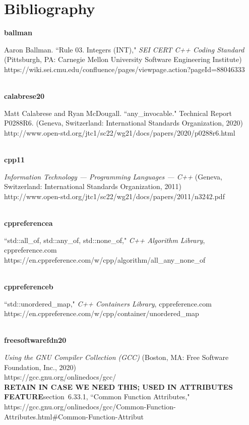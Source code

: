 
\chapter*{Bibliography}

\noindent\textbf{ballman}\\
\hspace*{2em}\parbox[t]{\textwidth}{Aaron Ballman. ``Rule 03. Integers (INT)," \textit{ SEI CERT C++ Coding Standard} (Pittsburgh, PA: Carnegie Mellon University Software Engineering Institute)\\
https://wiki.sei.cmu.edu/confluence/pages/viewpage.action?pageId=88046333}\\

\noindent\textbf{calabrese20}\\
\hspace*{2em}\parbox[t]{\textwidth}{Matt Calabrese and Ryan McDougall. ``{\ttfamily any\_invocable}."  Technical Report P0288R6. (Geneva, Switzerland: International Standards Organization, 2020)\\
http://www.open-std.org/jtc1/sc22/wg21/docs/papers/2020/p0288r6.html}\\

\noindent\textbf{cpp11}\\
\hspace*{2em}\parbox[t]{\textwidth}{\textit{Information Technology — Programming
Languages — C++} (Geneva, Switzerland: International Standards Organization, 2011)\\
http://www.open-std.org/jtc1/sc22/wg21/docs/papers/2011/n3242.pdf}\\

\noindent\textbf{cppreferencea}\\
\hspace*{2em}\parbox[t]{\textwidth}{``std::all\_of, std::any\_of, std::none\_of," \textit{C++ Algorithm Library}, cppreference.com\\
https://en.cppreference.com/w/cpp/algorithm/all\_any\_none\_of}\\

\noindent\textbf{cppreferenceb}\\
\hspace*{2em}\parbox[t]{\textwidth}{``std::unordered\_map," \textit{C++ Containers Library}, cppreference.com\\
https://en.cppreference.com/w/cpp/container/unordered\_map}\\

\noindent\textbf{freesoftwarefdn20}\\
\hspace*{2em}\parbox[t]{\textwidth}{\textit{Using the GNU Compiler Collection (GCC)} (Boston, MA: Free Software Foundation, Inc., 2020)\\
https://gcc.gnu.org/onlinedocs/gcc/\\
\textbf{RETAIN IN CASE WE NEED THIS; USED IN ATTRIBUTES FEATURE}\qquad  section~6.33.1, ``Common Function Attributes," \\
https://gcc.gnu.org/onlinedocs/gcc/Common-Function-Attributes.html\#Common-Function-Attribut}\\

